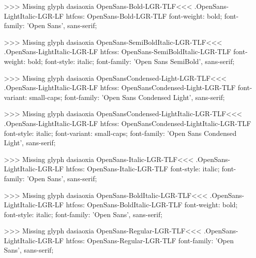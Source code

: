 >>>
Missing glyph	dasiaoxia
\<OpenSans-Bold-LGR-TLF\><<<
.OpenSans-LightItalic-LGR-LF
htfcss:  OpenSans-Bold-LGR-TLF  font-weight: bold; font-family: 'Open Sans', sans-serif;

>>>
Missing glyph	dasiaoxia
\<OpenSans-SemiBoldItalic-LGR-TLF\><<<
.OpenSans-LightItalic-LGR-LF
htfcss:  OpenSans-SemiBoldItalic-LGR-TLF  font-weight: bold; font-style: italic; font-family: 'Open Sans SemiBold', sans-serif;

>>>
Missing glyph	dasiaoxia
\<OpenSansCondensed-Light-LGR-TLF\><<<
.OpenSans-LightItalic-LGR-LF
htfcss:  OpenSansCondensed-Light-LGR-TLF  font-variant: small-caps; font-family: 'Open Sans Condensed Light', sans-serif;

>>>
Missing glyph	dasiaoxia
\<OpenSansCondensed-LightItalic-LGR-TLF\><<<
.OpenSans-LightItalic-LGR-LF
htfcss:  OpenSansCondensed-LightItalic-LGR-TLF  font-style: italic; font-variant: small-caps; font-family: 'Open Sans Condensed Light', sans-serif;

>>>
Missing glyph	dasiaoxia
\<OpenSans-Italic-LGR-TLF\><<<
.OpenSans-LightItalic-LGR-LF
htfcss:  OpenSans-Italic-LGR-TLF  font-style: italic; font-family: 'Open Sans', sans-serif;

>>>
Missing glyph	dasiaoxia
\<OpenSans-BoldItalic-LGR-TLF\><<<
.OpenSans-LightItalic-LGR-LF
htfcss:  OpenSans-BoldItalic-LGR-TLF  font-weight: bold; font-style: italic; font-family: 'Open Sans', sans-serif;

>>>
Missing glyph	dasiaoxia
\<OpenSans-Regular-LGR-TLF\><<<
.OpenSans-LightItalic-LGR-LF
htfcss:  OpenSans-Regular-LGR-TLF  font-family: 'Open Sans', sans-serif;

